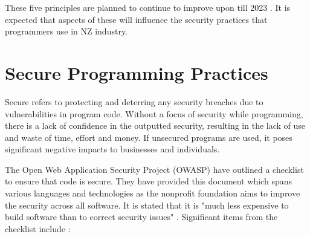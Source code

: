 \par These five principles are planned to continue to improve upon till 2023 \cite{securitystrat}. It is expected that aspects of these will influence the security practices that programmers use in NZ industry.

\section{Secure Programming Practices}

Secure refers to protecting and deterring any security breaches due to vulnerabilities in program code. Without a focus of security while programming, there is a lack of confidence in the outputted security, resulting in the lack of use and waste of time, effort and money. If unsecured programs are used, it poses significant negative impacts to businesses and individuals. 
\newline
\par The Open Web Application Security Project (OWASP) have outlined a checklist to ensure that code is secure. They have provided this document which spans various languages and technologies as the nonprofit foundation aims to improve the security across all software. It is stated that it is "much less expensive to build software than to correct security issues" \cite{owasp}.
\newline
\newline
Significant items from the checklist include \cite{owasp}: 

